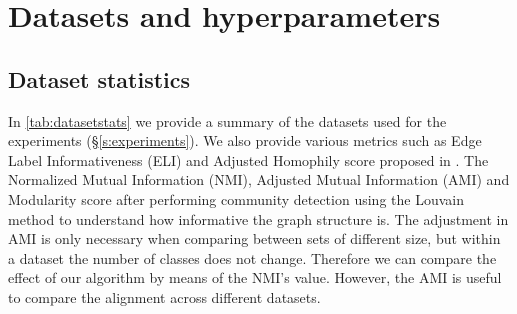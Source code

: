 \section{Datasets and hyperparameters} \label{app:hyperparams}
\subsection{Dataset statistics}\label{app:datasetstats}
In \autoref{tab:datasetstats} we provide a summary of the datasets used for the experiments (\S\ref{s:experiments}). We also provide various metrics such as Edge Label Informativeness (ELI) and Adjusted Homophily score proposed in \citep{platonov2023characterizing}. The Normalized Mutual Information (NMI), Adjusted Mutual Information (AMI) and Modularity score after performing community detection using the Louvain method to understand how informative the graph structure is.  The adjustment in AMI is only necessary when comparing between sets of different size, but within a dataset the number of classes does not change. Therefore we can compare the effect of our algorithm by means of the NMI’s value. However, the AMI is useful to compare the alignment across different datasets.




